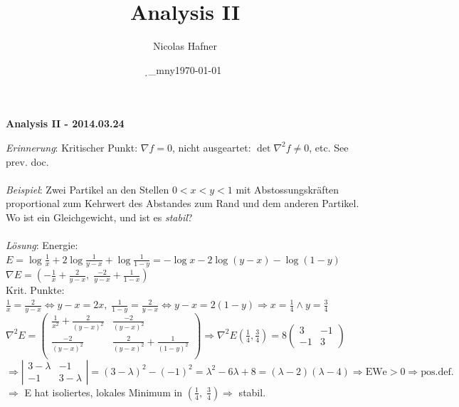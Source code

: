 \documentclass[12pt,a4paper,titlepage]{article}
\author{Nicolas Hafner}
\title{Analysis II}
\date{\d_mny\today}
\begin{document}
	
\begin{center}{\bfseries\Huge Analysis II - 2014.03.24}\end{center}
\textit{Erinnerung}: Kritischer Punkt: $\nabla f=0$, nicht ausgeartet: $\det\nabla^2f\neq 0$, etc. See prev. doc. \\
\\
\textit{Beispiel}: Zwei Partikel an den Stellen $0<x<y<1$ mit Abstossungskräften proportional zum Kehrwert des Abstandes zum Rand und dem anderen Partikel. Wo ist ein Gleichgewicht, und ist es \emph{stabil}? \\
\\
\textit{Lösung}: Energie: $E=\log\frac{1}{x}+2\log\frac{1}{y-x}+\log\frac{1}{1-y}=-\log x-2\log(y-x)-\log(1-y)$ \\
$\nabla E=(-\frac{1}{x}+\frac{2}{y-x},\;\frac{-2}{y-x}+\frac{1}{1-x})$ \\
Krit. Punkte: $\frac{1}{x}=\frac{2}{y-x} \iff y-x=2x,\; \frac{1}{1-y}=\frac{2}{y-x}\iff y-x=2(1-y) \Rightarrow x=\frac{1}{4}\land y=\frac{3}{4}$ \\
$\nabla^2E=\begin{pmatrix}
  \frac{1}{x^2}+\frac{2}{(y-x)^2} & \frac{-2}{(y-x)^2} \\
  \frac{-2}{(y-x)^2} & \frac{2}{(y-x)^2}+\frac{1}{(1-y)^2} \\
\end{pmatrix} \Rightarrow \nabla^2E(\frac{1}{4},\frac{3}{4})=8\begin{pmatrix}3&-1\\-1&3\end{pmatrix}$ \\
$\Rightarrow \left|\begin{matrix}3-\lambda & -1 \\ -1 & 3-\lambda\end{matrix}\right|=(3-\lambda)^2-(-1)^2=\lambda^2-6\lambda+8=(\lambda-2)(\lambda-4) \Rightarrow \text{EWe}>0 \Rightarrow \text{pos.def.}$ \\
$\Rightarrow$ E hat isoliertes, lokales Minimum in $(\frac{1}{4},\;\frac{3}{4}) \Rightarrow$ stabil.
\end{document}
